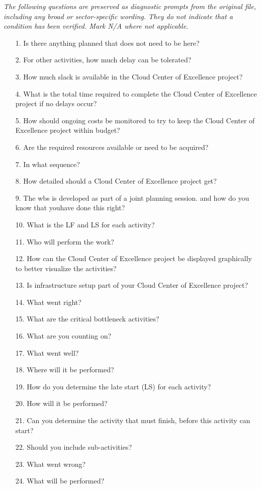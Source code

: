 \documentclass[10pt,letterpaper]{article}
\newcommand{\docsection}[1]{\par\Needspace{5\baselineskip}\vspace{8pt}{\large\sffamily\bfseries\color{navy}#1}\par\vspace{2pt}{\color{rulegrey}\rule{\linewidth}{.6pt}}\par}
\begin{document}
\docsection{03 \quad Source diagnostic checklist}
\textit{The following questions are preserved as diagnostic prompts from the original file, including any broad or sector-specific wording. They do not indicate that a condition has been verified. Mark N/A where not applicable.}
\begingroup\small\begin{enumerate}[leftmargin=2.1em, itemsep=4pt]
\item[1.] Is there anything planned that does not need to be here?
\item[2.] For other activities, how much delay can be tolerated?
\item[3.] How much slack is available in the Cloud Center of Excellence project?
\item[4.] What is the total time required to complete the Cloud Center of Excellence project if no delays occur?
\item[5.] How should ongoing costs be monitored to try to keep the Cloud Center of Excellence project within budget?
\item[6.] Are the required resources available or need to be acquired?
\item[7.] In what sequence?
\item[8.] How detailed should a Cloud Center of Excellence project get?
\item[9.] The wbs is developed as part of a joint planning session. and how do you know that youhave done this right?
\item[10.] What is the LF and LS for each activity?
\item[11.] Who will perform the work?
\item[12.] How can the Cloud Center of Excellence project be displayed graphically to better visualize the activities?
\item[13.] Is infrastructure setup part of your Cloud Center of Excellence project?
\item[14.] What went right?
\item[15.] What are the critical bottleneck activities?
\item[16.] What are you counting on?
\item[17.] What went well?
\item[18.] Where will it be performed?
\item[19.] How do you determine the late start (LS) for each activity?
\item[20.] How will it be performed?
\item[21.] Can you determine the activity that must finish, before this activity can start?
\item[22.] Should you include sub-activities?
\item[23.] What went wrong?
\item[24.] What will be performed?
\end{enumerate}\endgroup
\end{document}
